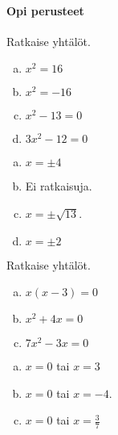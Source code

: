 \Harjoitustehtavat

\paragraph*{Opi perusteet}

\begin{tehtava}
    Ratkaise yhtälöt.
    \begin{enumerate}[a)]
        \item $x^2 = 16$
        \item $x^2 = - 16$
        \item $x^2 - 13 = 0$
        \item $3x^2 - 12 = 0$

    \end{enumerate}
    \begin{vastaus}
        \begin{enumerate}[a)]
            \item $x=\pm 4$
            \item Ei ratkaisuja. 
            \item $x = \pm \sqrt{13}$.
            \item $x=\pm 2$ 
        \end{enumerate}
    \end{vastaus}
\end{tehtava}

\begin{tehtava}
    Ratkaise yhtälöt.
    \begin{enumerate}[a)]
        \item $x(x-3)= 0$
        \item $x^2 + 4x = 0$
        \item $7x^2-3x = 0$
    \end{enumerate}
    \begin{vastaus}
        \begin{enumerate}[a)]
            \item $x=0$ tai $x=3$
            \item $x =0$ tai $x=-4$.
            \item $x=0$ tai $x=\frac{3}{7}$     
        \end{enumerate}
    \end{vastaus}
\end{tehtava}

